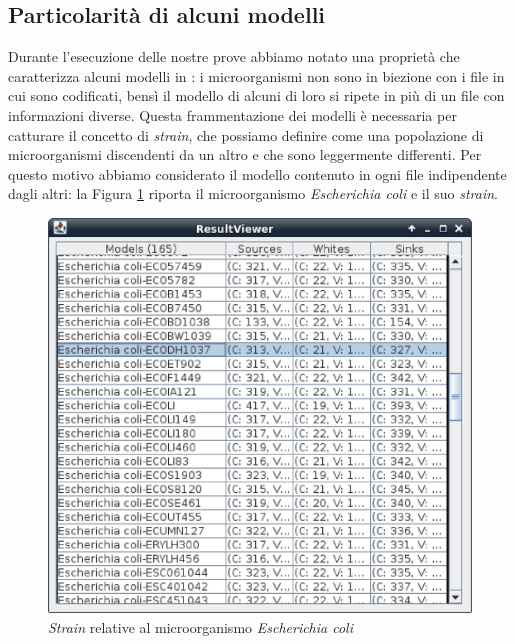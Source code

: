 \subsection{Particolarit\`a di alcuni modelli}
Durante l'esecuzione delle nostre prove abbiamo notato una propriet\`a
che caratterizza alcuni modelli in \cite{MetExplore}: i microorganismi
non sono in biezione con i file in cui sono codificati, bens\`i il
modello di alcuni di loro si ripete in pi\`u di un file con
informazioni diverse. Questa frammentazione dei modelli \`e necessaria
per catturare il concetto di \emph{strain}, che possiamo definire come
una popolazione di microorganismi discendenti da un altro e che sono
leggermente differenti. Per questo motivo abbiamo considerato il
modello contenuto in ogni file indipendente dagli altri: la Figura
\ref{fig:EscherichiaKoli-strains} riporta il microorganismo
\emph{Escherichia coli} e il suo \emph{strain}.
\begin{figure}
  \centering
  \includegraphics[scale=.7]{images/ResultViewer-Escherichia-family}
  \caption{\emph{Strain} relative al microorganismo \emph{Escherichia
      coli}}
  \label{fig:EscherichiaKoli-strains}
\end{figure}

